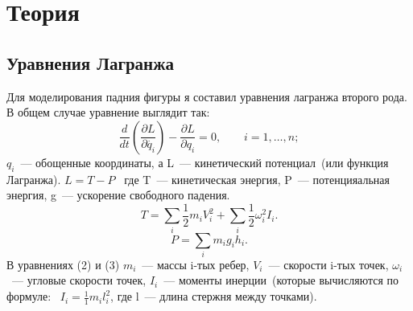 \section{Теория}
\subsection{Уравнения Лагранжа}
Для моделирования падния фигуры я составил уравнения лагранжа второго рода.
В общем случае уравнение выглядит так:
\begin{equation}
\frac{d}{dt}\left(\frac{\partial L}{\partial \dot{q_i}} \right)-\frac{\partial L}{\partial q_i}=0,\qquad i=1,\dotsc,n;
\end{equation}
$q_i$~--- обощенные координаты, а L~--- кинетический потенциал~(или функция Лагранжа). $L=T-P$~  где T~--- кинетическая энергия, P~--- потенцияальная энергия, g~--- ускорение свободного падения.
\begin{equation}
T=\sum_{i} \frac{1}{2}m_i V_i^2+\sum_{i} \frac{1}{2}\omega_i^2 I_i.
\end{equation}
\begin{equation}
P=\sum_{i} m_i g_i h_i.
\end{equation}
В уравнениях (2) и (3) $m_i$~--- массы i-тых ребер, $V_i$~--- скорости i-тых точек, $\omega_i$~--- угловые скорости точек, $I_i$~--- моменты инерции~(которые вычисляются по формуле:~ $I_i=\frac{1}{1}m_i l_i^2$, где l~--- длина стержня между точками).
